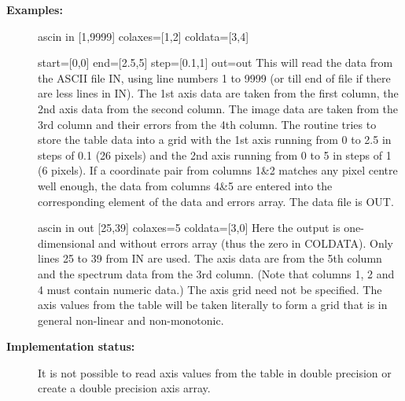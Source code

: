 \begin{description}
\begin{terminalv}
\end{terminalv}

\item [\textbf{Examples:}]
\begin{terminalv}
ascin in [1,9999] colaxes=[1,2] coldata=[3,4]

start=[0,0] end=[2.5,5] step=[0.1,1] out=out
   This will read the data from the ASCII file IN, using line
   numbers 1 to 9999 (or till end of file if there are less lines
   in IN). The 1st axis data are taken from the first column, the
   2nd axis data from the second column. The image data are taken
   from the 3rd column and their errors from the 4th column. The
   routine tries to store the table data into a grid with the 1st
   axis running from 0 to 2.5 in steps of 0.1 (26 pixels) and the
   2nd axis running from 0 to 5 in steps of 1 (6 pixels). If a
   coordinate pair from columns 1&2 matches any pixel centre well
   enough, the data from columns 4&5 are entered into the
   corresponding element of the data and errors array. The data
   file is OUT.

ascin in out [25,39] colaxes=5 coldata=[3,0]
   Here the output is one-dimensional and without errors array
   (thus the zero in COLDATA). Only lines 25 to 39 from IN are
   used. The axis data are from the 5th column and the spectrum
   data from the 3rd column. (Note that columns 1, 2 and 4 must
   contain numeric data.) The axis grid need not be specified. The
   axis values from the table will be taken literally to form a
   grid that is in general non-linear and non-monotonic.
\end{terminalv}

\item [\textbf{Implementation status:}]
   It is not possible to read axis values from the table in double
   precision or create a double precision axis array.
\end{description}
